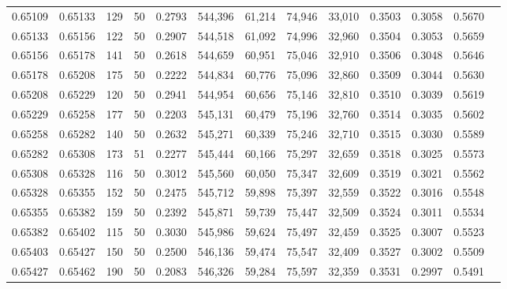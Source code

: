 \begin{tabular}{rrrrrrrrrrrrr}
0.65109 & 0.65133 &   129 &  50 &                                     0.2793 & 544,396 &  61,214 &  74,946 &  33,010 & 0.3503 & 0.3058 & 0.5670 \\
0.65133 & 0.65156 &   122 &  50 &                                     0.2907 & 544,518 &  61,092 &  74,996 &  32,960 & 0.3504 & 0.3053 & 0.5659 \\
0.65156 & 0.65178 &   141 &  50 &                                     0.2618 & 544,659 &  60,951 &  75,046 &  32,910 & 0.3506 & 0.3048 & 0.5646 \\
0.65178 & 0.65208 &   175 &  50 &                                     0.2222 & 544,834 &  60,776 &  75,096 &  32,860 & 0.3509 & 0.3044 & 0.5630 \\
0.65208 & 0.65229 &   120 &  50 &                                     0.2941 & 544,954 &  60,656 &  75,146 &  32,810 & 0.3510 & 0.3039 & 0.5619 \\
0.65229 & 0.65258 &   177 &  50 &                                     0.2203 & 545,131 &  60,479 &  75,196 &  32,760 & 0.3514 & 0.3035 & 0.5602 \\
0.65258 & 0.65282 &   140 &  50 &                                     0.2632 & 545,271 &  60,339 &  75,246 &  32,710 & 0.3515 & 0.3030 & 0.5589 \\
0.65282 & 0.65308 &   173 &  51 &                                     0.2277 & 545,444 &  60,166 &  75,297 &  32,659 & 0.3518 & 0.3025 & 0.5573 \\
0.65308 & 0.65328 &   116 &  50 &                                     0.3012 & 545,560 &  60,050 &  75,347 &  32,609 & 0.3519 & 0.3021 & 0.5562 \\
0.65328 & 0.65355 &   152 &  50 &                                     0.2475 & 545,712 &  59,898 &  75,397 &  32,559 & 0.3522 & 0.3016 & 0.5548 \\
0.65355 & 0.65382 &   159 &  50 &                                     0.2392 & 545,871 &  59,739 &  75,447 &  32,509 & 0.3524 & 0.3011 & 0.5534 \\
0.65382 & 0.65402 &   115 &  50 &                                     0.3030 & 545,986 &  59,624 &  75,497 &  32,459 & 0.3525 & 0.3007 & 0.5523 \\
0.65403 & 0.65427 &   150 &  50 &                                     0.2500 & 546,136 &  59,474 &  75,547 &  32,409 & 0.3527 & 0.3002 & 0.5509 \\
0.65427 & 0.65462 &   190 &  50 &                                     0.2083 & 546,326 &  59,284 &  75,597 &  32,359 & 0.3531 & 0.2997 & 0.5491 \\

\end{tabular}

